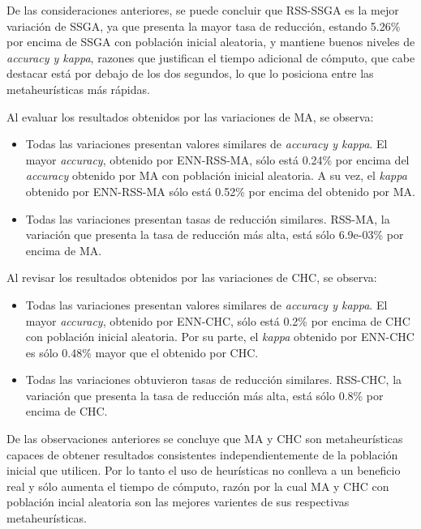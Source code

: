 De las consideraciones anteriores, se puede concluir que RSS-SSGA es la mejor variación de SSGA, ya que presenta la mayor tasa de reducción, estando 5.26\% por encima de SSGA con población inicial aleatoria, y mantiene buenos niveles de \emph{accuracy y kappa}, razones que justifican el tiempo adicional de cómputo, que cabe destacar está por debajo de los dos segundos, lo que lo posiciona entre las metaheurísticas más rápidas.

Al evaluar los resultados obtenidos por las variaciones de MA, se observa:

\begin{itemize}

\item Todas las variaciones presentan valores similares de \emph{accuracy y kappa}. El mayor \emph{accuracy}, obtenido por ENN-RSS-MA, sólo está 0.24\% por encima del \emph{accuracy} obtenido por MA con población inicial aleatoria. A su vez, el \emph{kappa} obtenido por ENN-RSS-MA sólo está 0.52\% por encima del obtenido por MA. 

\item Todas las variaciones presentan tasas de reducción similares. RSS-MA, la variación que presenta la tasa de reducción más alta, está sólo 6.9e-03\% por encima de MA. 

\end{itemize}

Al revisar los resultados obtenidos por las variaciones de CHC, se observa:

\begin{itemize}

\item Todas las variaciones presentan valores similares de \emph{accuracy y kappa}. El mayor \emph{accuracy}, obtenido por ENN-CHC, sólo está 0.2\% por encima de CHC con población inicial aleatoria. Por su parte, el \emph{kappa} obtenido por ENN-CHC es sólo 0.48\% mayor que el obtenido por CHC.

\item Todas las variaciones obtuvieron tasas de reducción similares. RSS-CHC, la variación que presenta la tasa de reducción más alta, está sólo 0.8\% por encima de CHC.

\end{itemize}

De las observaciones anteriores se concluye que MA y CHC son metaheurísticas capaces de obtener resultados consistentes independientemente de la población inicial que utilicen. Por lo tanto el uso de heurísticas no conlleva a un beneficio real y sólo aumenta el tiempo de cómputo, razón por la cual MA y CHC con población incial aleatoria son las mejores varientes de sus respectivas metaheurísticas.


